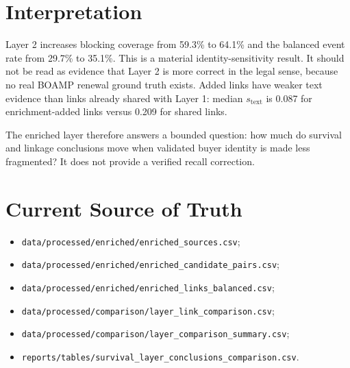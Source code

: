 \documentclass[11pt]{article}
\begin{document}
\section{Interpretation}

Layer 2 increases blocking coverage from 59.3\% to 64.1\% and the balanced
event rate from 29.7\% to 35.1\%. This is a material identity-sensitivity
result. It should not be read as evidence that Layer 2 is more correct in the
legal sense, because no real BOAMP renewal ground truth exists. Added links
have weaker text evidence than links already shared with Layer 1: median
\(s_{\mathrm{text}}\) is 0.087 for enrichment-added links versus 0.209 for
shared links.

The enriched layer therefore answers a bounded question: how much do survival
and linkage conclusions move when validated buyer identity is made less
fragmented? It does not provide a verified recall correction.

\section{Current Source of Truth}

\begin{itemize}
    \item \texttt{data/processed/enriched/enriched\_sources.csv};
    \item \texttt{data/processed/enriched/enriched\_candidate\_pairs.csv};
    \item \texttt{data/processed/enriched/enriched\_links\_balanced.csv};
    \item \texttt{data/processed/comparison/layer\_link\_comparison.csv};
    \item \texttt{data/processed/comparison/layer\_comparison\_summary.csv};
    \item \texttt{reports/tables/survival\_layer\_conclusions\_comparison.csv}.
\end{itemize}
\end{document}
